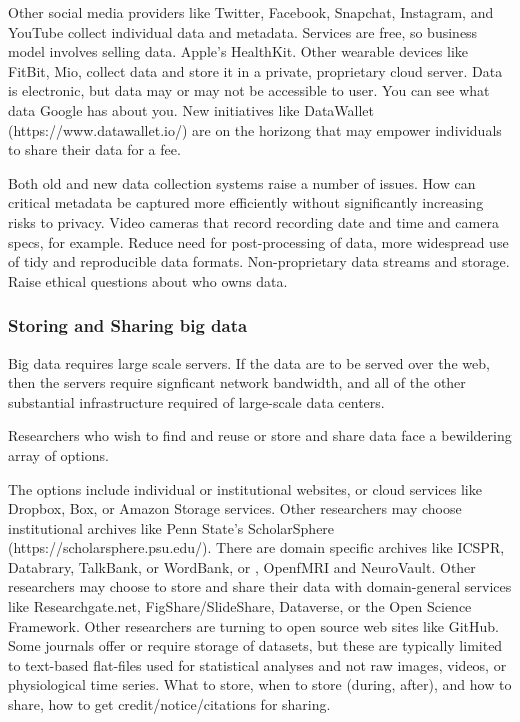 \documentclass[letterpaper,man,apacite]{apa6}
\begin{document}
Other social media providers like Twitter, Facebook, Snapchat, Instagram, and YouTube collect individual data and metadata.
Services are free, so business model involves selling data.
Apple's HealthKit.
Other wearable devices like FitBit, Mio, collect data and store it in a private, proprietary cloud server.
Data is electronic, but data may or may not be accessible to user.
You can see what data Google has about you.
New initiatives like DataWallet (https://www.datawallet.io/) are on the horizong that may empower individuals to share their data for a fee.

Both old and new data collection systems raise a number of issues.
How can critical metadata be captured more efficiently without significantly increasing risks to privacy.
Video cameras that record recording date and time and camera specs, for example.
Reduce need for post-processing of data, more widespread use of tidy and reproducible data formats.
Non-proprietary data streams and storage.
Raise ethical questions about who owns data.

\subsubsection{Storing and Sharing big data}

Big data requires large scale servers.
If the data are to be served over the web, then the servers require signficant network bandwidth, and all of the other substantial infrastructure required of large-scale data centers.

Researchers who wish to find and reuse or store and share data face a bewildering array of options.


The options include individual or institutional websites, or cloud services like Dropbox, Box, or Amazon Storage services.
Other researchers may choose institutional archives like Penn State's ScholarSphere (https://scholarsphere.psu.edu/).
There are domain specific archives like ICSPR, Databrary, TalkBank, or WordBank, or , OpenfMRI and NeuroVault.
Other researchers may choose to store and share their data with domain-general services like Researchgate.net, FigShare/SlideShare, Dataverse, or the Open Science Framework.
Other researchers are turning to open source web sites like GitHub.
Some journals offer or require storage of datasets, but these are typically limited to text-based flat-files used for statistical analyses and not raw images, videos, or physiological time series.
What to store, when to store (during, after), and how to share, how to get credit/notice/citations for sharing.
\end{document}
